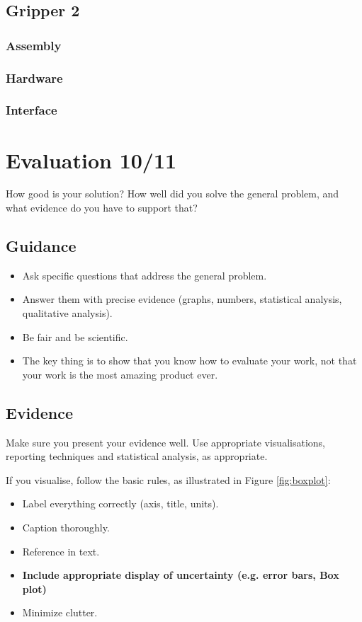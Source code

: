\documentclass{l4proj}
\begin{document}
\section{Gripper 2}
\subsection{Assembly}
\subsection{Hardware}
\subsection{Interface}


\chapter{Evaluation 10/11} 
How good is your solution? How well did you solve the general problem, and what evidence do you have to support that?

\section{Guidance}
\begin{itemize}
    \item
        Ask specific questions that address the general problem.
    \item
        Answer them with precise evidence (graphs, numbers, statistical
        analysis, qualitative analysis).
    \item
        Be fair and be scientific.
    \item
        The key thing is to show that you know how to evaluate your work, not
        that your work is the most amazing product ever.
\end{itemize}

\section{Evidence}
Make sure you present your evidence well. Use appropriate visualisations, reporting techniques and statistical analysis, as appropriate.

If you visualise, follow the basic rules, as illustrated in Figure \ref{fig:boxplot}:
\begin{itemize}
\item Label everything correctly (axis, title, units).
\item Caption thoroughly.
\item Reference in text.
\item \textbf{Include appropriate display of uncertainty (e.g. error bars, Box plot)}
\item Minimize clutter.
\end{itemize}
\end{document}
